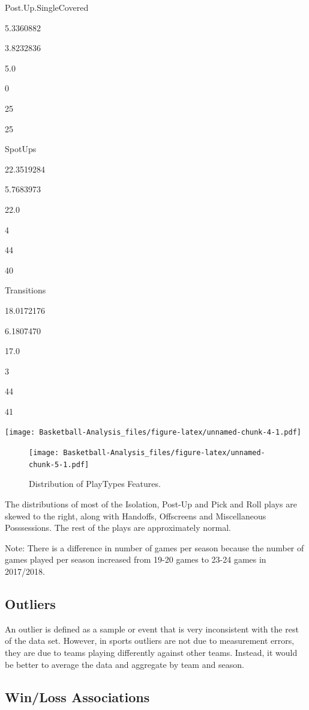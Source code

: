 \documentclass[]{book}
\begin{document}
Post.Up.SingleCovered

5.3360882

3.8232836

5.0

0

25

25

SpotUps

22.3519284

5.7683973

22.0

4

44

40

Transitions

18.0172176

6.1807470

17.0

3

44

41

\texttt{[image: Basketball-Analysis\_files/figure-latex/unnamed-chunk-4-1.pdf]}

\begin{figure}
\centering
\texttt{[image: Basketball-Analysis\_files/figure-latex/unnamed-chunk-5-1.pdf]}
\caption{\label{fig:unnamed-chunk-5}Distribution of PlayTypes Features.}
\end{figure}

The distributions of most of the Isolation, Post-Up and Pick and Roll plays are skewed to the right, along with Handoffs, Offscreens and Miscellaneous Posssessions. The rest of the plays are approximately normal.

Note: There is a difference in number of games per season because the number of games played per season increased from 19-20 games to 23-24 games in 2017/2018.

\hypertarget{outliers}{%
\subsection{Outliers}\label{outliers}}

An outlier is defined as a sample or event that is very inconsistent with the rest of the data set. However, in sports outliers are not due to measurement errors, they are due to teams playing differently against other teams. Instead, it would be better to average the data and aggregate by team and season.

\hypertarget{winloss-associations}{%
\subsection{Win/Loss Associations}\label{winloss-associations}}
\end{document}
